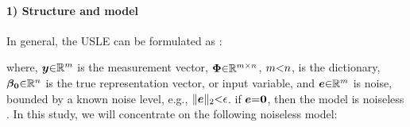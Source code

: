 \paragraph{1) Structure and model}
In general, the USLE can be formulated as \cite{Cand`es2005b,Donoho2006a}:

where, $\boldsymbol{y} {\in} \mathbb{R}^{m}$ is the measurement vector, 
$\boldsymbol{\Phi} {\in} \mathbb{R}^{m {\times} n}$, $m {<} n$, is the dictionary, $\boldsymbol{\beta_0} {\in} \mathbb{R}^{n}$ is the true representation vector, 
or input variable, 
and $\boldsymbol{e} {\in} \mathbb{R}^{m}$ is noise, 
bounded by a known noise level, e.g., $\Vert \boldsymbol{e} \Vert_2 {<} \epsilon$. 
if $\boldsymbol{e} {=} \boldsymbol{0}$, then the model is noiseless \cite{Donoho2003,Gribonval2003a}.
In this study, we will concentrate on the following noiseless model:


